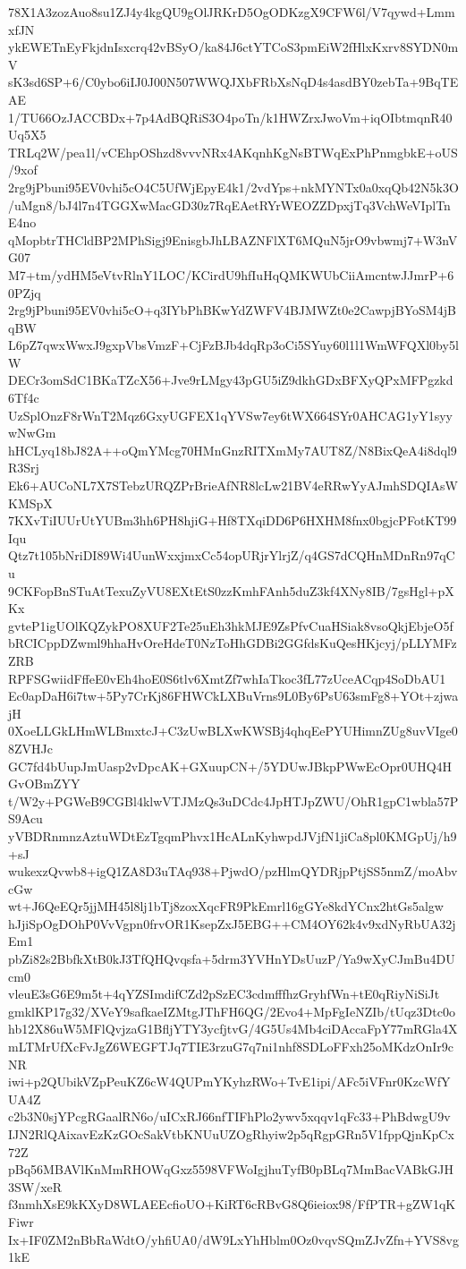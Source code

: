 78X1A3zozAuo8su1ZJ4y4kgQU9gOlJRKrD5OgODKzgX9CFW6l/V7qywd+LmmxfJN
ykEWETnEyFkjdnIsxcrq42vBSyO/ka84J6ctYTCoS3pmEiW2fHlxKxrv8SYDN0mV
sK3sd6SP+6/C0ybo6iIJ0J00N507WWQJXbFRbXsNqD4s4asdBY0zebTa+9BqTEAE
1/TU66OzJACCBDx+7p4AdBQRiS3O4poTn/k1HWZrxJwoVm+iqOIbtmqnR40Uq5X5
TRLq2W/pea1l/vCEhpOShzd8vvvNRx4AKqnhKgNsBTWqExPhPnmgbkE+oUS/9xof
2rg9jPbuni95EV0vhi5cO4C5UfWjEpyE4k1/2vdYps+nkMYNTx0a0xqQb42N5k3O
/uMgn8/bJ4l7n4TGGXwMacGD30z7RqEAetRYrWEOZZDpxjTq3VchWeVIplTnE4no
qMopbtrTHCldBP2MPhSigj9EnisgbJhLBAZNFlXT6MQuN5jrO9vbwmj7+W3nVG07
M7+tm/ydHM5eVtvRlnY1LOC/KCirdU9hfIuHqQMKWUbCiiAmcntwJJmrP+60PZjq
2rg9jPbuni95EV0vhi5cO+q3IYbPhBKwYdZWFV4BJMWZt0e2CawpjBYoSM4jBqBW
L6pZ7qwxWwxJ9gxpVbsVmzF+CjFzBJb4dqRp3oCi5SYuy60l1l1WmWFQXl0by5lW
DECr3omSdC1BKaTZcX56+Jve9rLMgy43pGU5iZ9dkhGDxBFXyQPxMFPgzkd6Tf4c
UzSplOnzF8rWnT2Mqz6GxyUGFEX1qYVSw7ey6tWX664SYr0AHCAG1yY1syywNwGm
hHCLyq18bJ82A++oQmYMcg70HMnGnzRITXmMy7AUT8Z/N8BixQeA4i8dql9R3Srj
Ek6+AUCoNL7X7STebzURQZPrBrieAfNR8lcLw21BV4eRRwYyAJmhSDQIAsWKMSpX
7KXvTiIUUrUtYUBm3hh6PH8hjiG+Hf8TXqiDD6P6HXHM8fnx0bgjcPFotKT99Iqu
Qtz7t105bNriDI89Wi4UunWxxjmxCc54opURjrYlrjZ/q4GS7dCQHnMDnRn97qCu
9CKFopBnSTuAtTexuZyVU8EXtEtS0zzKmhFAnh5duZ3kf4XNy8IB/7gsHgl+pXKx
gvteP1igUOlKQZykPO8XUF2Te25uEh3hkMJE9ZsPfvCuaHSiak8vsoQkjEbjeO5f
bRCICppDZwml9hhaHvOreHdeT0NzToHhGDBi2GGfdsKuQesHKjcyj/pLLYMFzZRB
RPFSGwiidFffeE0vEh4hoE0S6tlv6XmtZf7whIaTkoc3fL77zUceACqp4SoDbAU1
Ec0apDaH6i7tw+5Py7CrKj86FHWCkLXBuVrns9L0By6PsU63smFg8+YOt+zjwajH
0XoeLLGkLHmWLBmxtcJ+C3zUwBLXwKWSBj4qhqEePYUHimnZUg8uvVIge08ZVHJc
GC7fd4bUupJmUasp2vDpcAK+GXuupCN+/5YDUwJBkpPWwEcOpr0UHQ4HGvOBmZYY
t/W2y+PGWeB9CGBl4klwVTJMzQs3uDCdc4JpHTJpZWU/OhR1gpC1wbla57PS9Acu
yVBDRnmnzAztuWDtEzTgqmPhvx1HcALnKyhwpdJVjfN1jiCa8pl0KMGpUj/h9+sJ
wukexzQvwb8+igQ1ZA8D3uTAq938+PjwdO/pzHlmQYDRjpPtjSS5nmZ/moAbvcGw
wt+J6QeEQr5jjMH45l8lj1bTj8zoxXqcFR9PkEmrl16gGYe8kdYCnx2htGs5algw
hJjiSpOgDOhP0VvVgpn0frvOR1KsepZxJ5EBG++CM4OY62k4v9xdNyRbUA32jEm1
pbZi82s2BbfkXtB0kJ3TfQHQvqsfa+5drm3YVHnYDsUuzP/Ya9wXyCJmBu4DUcm0
vleuE3sG6E9m5t+4qYZSImdifCZd2pSzEC3cdmfffhzGryhfWn+tE0qRiyNiSiJt
gmklKP17g32/XVeY9safkaeIZMtgJThFH6QG/2Evo4+MpFgIeNZIb/tUqz3Dtc0o
hb12X86uW5MFlQvjzaG1BfljYTY3ycfjtvG/4G5Us4Mb4ciDAccaFpY77mRGla4X
mLTMrUfXcFvJgZ6WEGFTJq7TIE3rzuG7q7ni1nhf8SDLoFFxh25oMKdzOnIr9cNR
iwi+p2QUbikVZpPeuKZ6cW4QUPmYKyhzRWo+TvE1ipi/AFc5iVFnr0KzcWfYUA4Z
c2b3N0sjYPcgRGaalRN6o/uICxRJ66nfTIFhPlo2ywv5xqqv1qFc33+PhBdwgU9v
IJN2RlQAixavEzKzGOcSakVtbKNUuUZOgRhyiw2p5qRgpGRn5V1fppQjnKpCx72Z
pBq56MBAVlKnMmRHOWqGxz5598VFWoIgjhuTyfB0pBLq7MmBacVABkGJH3SW/xeR
f3nmhXsE9kKXyD8WLAEEcfioUO+KiRT6cRBvG8Q6ieiox98/FfPTR+gZW1qKFiwr
Ix+IF0ZM2nBbRaWdtO/yhfiUA0/dW9LxYhHblm0Oz0vqvSQmZJvZfn+YVS8vg1kE
